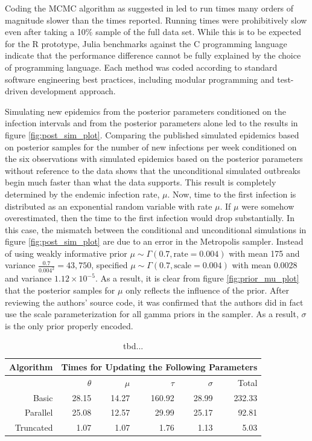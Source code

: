 \documentclass{uwstat572}
\begin{document}
Coding the MCMC algorithm as suggested in \citet{Brown} led to run times many orders of magnitude slower than the times reported. 
Running times were prohibitively slow even after taking a 10\% sample of the full data set. 
While this is to be expected for the R prototype, Julia benchmarks against the C programming language indicate that the performance difference cannot be fully explained by the choice of programming language. 
Each method was coded according to standard software engineering best practices, including modular programming and test-driven development approach.  

Simulating new epidemics from the posterior parameters conditioned on the infection intervals and from the posterior parameters alone led \citet{Brown} to the results in figure \ref{fig:post_sim_plot}. 
Comparing the published simulated epidemics based on posterior samples for the number of new infections per week conditioned on the six observations with simulated epidemics based on the posterior parameters without reference to the data shows that the unconditional simulated outbreaks begin much faster than what the data supports. 
This result is completely determined by the endemic infection rate, $\mu$. 
Now, time to the first infection is distributed as an exponential random variable with rate $\mu$. 
If $\mu$ were somehow overestimated, then the time to the first infection would drop substantially.
In this case, the mismatch between the conditional and unconditional simulations in figure \ref{fig:post_sim_plot} are due to an error in the Metropolis sampler. 
Instead of using weakly informative prior $\mu \sim \Gamma(0.7, \text{rate}=0.004)$ with mean 175 and variance $\frac{0.7}{0.004^2}=43,750$, \citep{Brown} specified $\mu \sim \Gamma(0.7, \text{scale}=0.004)$ with mean 0.0028 and variance $1.12\times10^{-5}$. 
As a result, it is clear from figure \ref{fig:prior_mu_plot} that the posterior samples for $\mu$ only reflects the influence of the prior. 
After reviewing the authors' source code, it was confirmed that the authors did in fact use the scale parameterization for all gamma priors in the sampler. 
As a result, $\sigma$ is the only prior properly encoded. 

\begin{table}[ht]
\centering
\begin{tabular}{r|rrrrr}
  Algorithm & \multicolumn{5}{c}{Times for Updating the Following Parameters} \\
 \hline
 & $\theta$ & $\mu$ & $\tau$ & $\sigma$ & Total \\ 
  \hline
  Basic & 28.15 & 14.27 & 160.92 & 28.99 & 232.33 \\ 
  Parallel & 25.08 & 12.57 & 29.99 & 25.17 & 92.81 \\ 
  Truncated & 1.07 & 1.07 & 1.76 & 1.13 & 5.03 \\ 
  \hline
\end{tabular}
\caption{tbd...}
\end{table}
\end{document}
